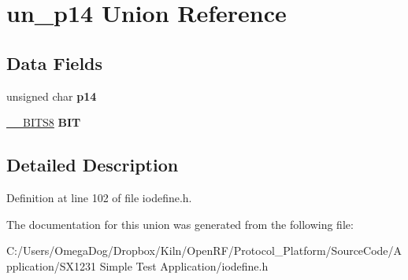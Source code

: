 \hypertarget{unionun__p14}{\section{un\-\_\-p14 Union Reference}
\label{unionun__p14}
}
\subsection*{Data Fields}
\begin{DoxyCompactItemize}
\item 
\hypertarget{unionun__p14_af1d937598822586cc2cf287de080e5df}{unsigned char {\bfseries p14}}\label{unionun__p14_af1d937598822586cc2cf287de080e5df}

\item 
\hypertarget{unionun__p14_a16cc8d9438d4a6565fdeef3a727ebfdb}{\hyperlink{struct_____b_i_t_s8}{\-\_\-\-\_\-\-B\-I\-T\-S8} {\bfseries B\-I\-T}}\label{unionun__p14_a16cc8d9438d4a6565fdeef3a727ebfdb}

\end{DoxyCompactItemize}


\subsection{Detailed Description}


Definition at line 102 of file iodefine.\-h.



The documentation for this union was generated from the following file\-:\begin{DoxyCompactItemize}
\item 
C\-:/\-Users/\-Omega\-Dog/\-Dropbox/\-Kiln/\-Open\-R\-F/\-Protocol\-\_\-\-Platform/\-Source\-Code/\-Application/\-S\-X1231 Simple Test Application/iodefine.\-h\end{DoxyCompactItemize}
